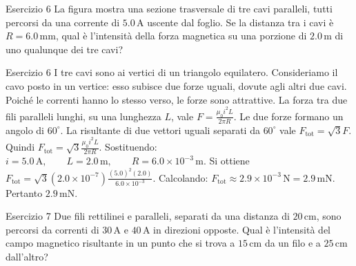\documentclass[a4paper]{article}
\begin{document}
\begin{snippetexercise}{Esercizio 6}
    La figura mostra una sezione trasversale di tre cavi paralleli, tutti
    percorsi da una corrente di \(5.0\,\mathrm{A}\) uscente dal foglio.
    Se la distanza tra i cavi è \(R = 6.0\,\mathrm{mm}\), qual è l'intensità
    della forza magnetica su una porzione di \(2.0\,\mathrm{m}\) di uno
    qualunque dei tre cavi?

\end{snippetexercise}
\begin{snippetsolution}{Esercizio 6}
    I tre cavi sono ai vertici di un triangolo equilatero. Consideriamo il cavo
    posto in un vertice: esso subisce due forze uguali, dovute agli altri due
    cavi.
    Poiché le correnti hanno lo stesso verso, le forze sono attrattive.
    La forza tra due fili paralleli lunghi, su una lunghezza \(L\), vale
    \(F = \frac{\mu_0 i^2L}{2\pi R}.\)
    Le due forze formano un angolo di \(60^\circ\). La risultante di due
    vettori uguali separati da \(60^\circ\) vale
    \(F_{\mathrm{tot}} = \sqrt{3}F.\)
    Quindi
    \(F_{\mathrm{tot}} = \sqrt{3} \frac{\mu_0 i^2L}{2\pi R}.\)
    Sostituendo:
    \(i = 5.0\,\mathrm{A}, \qquad L = 2.0\,\mathrm{m}, \qquad R = 6.0 \times 10^{-3}\,\mathrm{m}.\)
    Si ottiene
    \(F_{\mathrm{tot}} = \sqrt{3} \left(2.0 \times 10^{-7}\right) \frac{(5.0)^2(2.0)}{6.0 \times 10^{-3}}.\)
    Calcolando:
    \(F_{\mathrm{tot}} \approx 2.9 \times 10^{-3}\,\mathrm{N} = 2.9\,\mathrm{mN}.\)
    Pertanto
    \(\boxed{2.9\,\mathrm{mN}}.\)
\end{snippetsolution}
\begin{snippetexercise}{Esercizio 7}
    Due fili rettilinei e paralleli, separati da una distanza di
    \(20\,\mathrm{cm}\), sono percorsi da correnti di \(30\,\mathrm{A}\) e
    \(40\,\mathrm{A}\) in direzioni opposte. Qual è l'intensità del campo
    magnetico risultante in un punto che si trova a \(15\,\mathrm{cm}\) da un
    filo e a \(25\,\mathrm{cm}\) dall'altro?

\end{snippetexercise}
\end{document}
